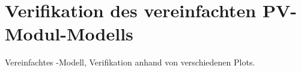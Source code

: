 \chapter{Verifikation des vereinfachten PV-Modul-Modells}
\label{app:simu:module:simple}

Vereinfachtes  -Modell,  Verifikation anhand  von  verschiedenen
Plots.


